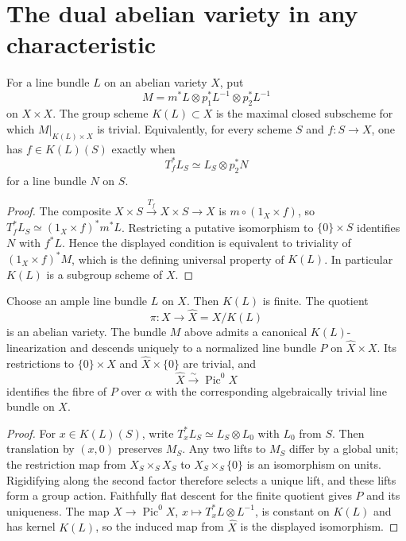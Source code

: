 \section{The dual abelian variety in any characteristic}
\label{mumford-III13-source}

\begin{definition}
\label{mumford-def-KL}
For a line bundle $L$ on an abelian variety $X$, put
\[
M=m^*L\otimes p_1^*L^{-1}\otimes p_2^*L^{-1}
\]
on $X\times X$. The group scheme $K(L)\subset X$ is the maximal closed
subscheme for which $M|_{K(L)\times X}$ is trivial. Equivalently, for every
scheme $S$ and $f:S\to X$, one has $f\in K(L)(S)$ exactly when
\[
T_f^*L_S\simeq L_S\otimes p_2^*N
\]
for a line bundle $N$ on $S$.
\end{definition}
\begin{proof}
The composite $X\times S\xrightarrow{T_f}X\times S\to X$ is
$m\circ(1_X\times f)$, so
$T_f^*L_S\simeq(1_X\times f)^*m^*L$. Restricting a putative isomorphism
to $\{0\}\times S$ identifies $N$ with $f^*L$. Hence the displayed
condition is equivalent to triviality of $(1_X\times f)^*M$, which is the
defining universal property of $K(L)$. In particular $K(L)$ is a subgroup
scheme of $X$.
\end{proof}

\begin{construction}
\label{mumford-thm-dual-any-characteristic}
\label{mumford-prop-abelian-quotient}
Choose an ample line bundle $L$ on $X$. Then $K(L)$ is finite. The quotient
\[
\pi:X\longrightarrow\widehat X=X/K(L)
\]
is an abelian variety. The bundle $M$ above admits a canonical
$K(L)$-linearization and descends uniquely to a normalized line bundle $P$ on
$\widehat X\times X$. Its restrictions to $\{0\}\times X$ and
$\widehat X\times\{0\}$ are trivial, and
\[
\widehat X\xrightarrow{\sim}\operatorname{Pic}^0X
\]
identifies the fibre of $P$ over $\alpha$ with the corresponding algebraically
trivial line bundle on $X$.
\end{construction}
\begin{proof}
For $x\in K(L)(S)$, write $T_x^*L_S\simeq L_S\otimes L_0$ with $L_0$ from
$S$. Then translation by $(x,0)$ preserves $M_S$. Any two lifts to $M_S$
differ by a global unit; the restriction map from $X_S\times_SX_S$ to
$X_S\times_S\{0\}$ is an isomorphism on units. Rigidifying along the second
factor therefore selects a unique lift, and these lifts form a group action.
Faithfully flat descent for the finite quotient gives $P$ and its uniqueness.
The map $X\to\operatorname{Pic}^0X$, $x\mapsto T_x^*L\otimes L^{-1}$, is
constant on $K(L)$ and has kernel $K(L)$, so the induced map from $\widehat X$
is the displayed isomorphism.
\end{proof}

